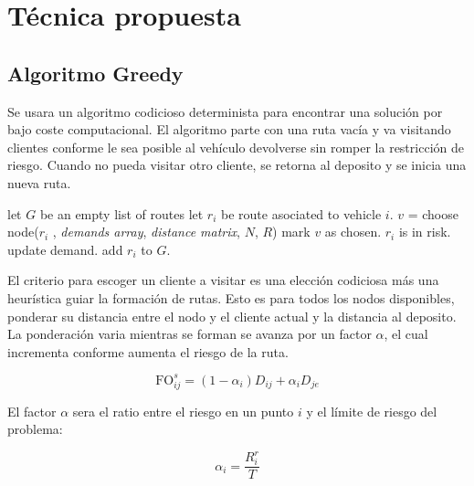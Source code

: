 \documentclass[conference]{IEEEtran}
\begin{document}
\section{Técnica propuesta}


\subsection{Algoritmo Greedy}
Se usara un algoritmo codicioso determinista para encontrar una solución por bajo coste computacional. El algoritmo parte con una ruta vacía y va visitando clientes conforme le sea posible al vehículo devolverse sin romper la restricción de riesgo. Cuando no pueda visitar otro cliente, se retorna al deposito y se inicia una nueva ruta. 

\begin{algorithm}
\begin{algorithmic}[1]
\State let $G$ be an empty list of routes  
    \State let $r_i$ be route asociated to vehicle $i$.
        \State $v$ = choose node($r_i$ , \textit{demands array}, \textit{distance matrix}, $N$, $R$)
        \State mark $v$ as chosen.
        \Else 
        \State $r_i$ is in risk.
        \EndIf
    \EndWhile
    \State update demand.
    \State add $r_i$ to $G$.
\EndWhile
\EndProcedure
\end{algorithmic}
\end{algorithm}


El criterio para escoger un cliente a visitar es una elección codiciosa más una heurística guiar la formación de rutas. Esto es para todos los nodos disponibles, ponderar su distancia entre el nodo y el cliente actual y la distancia al deposito. La ponderación varia mientras se forman se avanza por un factor $\alpha$, el cual incrementa conforme aumenta el riesgo de la ruta.

\begin{equation}
    \text{FO}^s_{ij} = (1-\alpha_i)D_{ij} + \alpha_i D_{je} 
\end{equation}

El factor $\alpha$ sera el ratio entre el riesgo en un punto $i$ y el límite de riesgo del problema:

\begin{equation}
    \alpha_i = \frac{R^r_{i}}{T} 
\end{equation}
\end{document}
